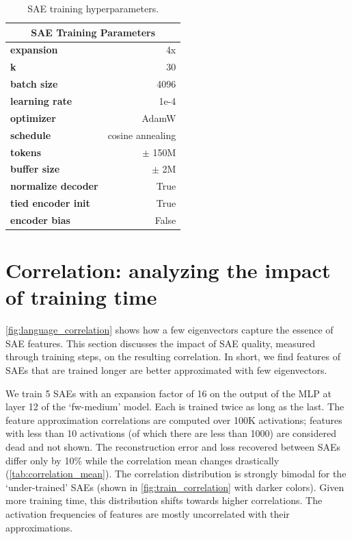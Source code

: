 \documentclass{article} %
\begin{document}
\begin{table}[H]
    \centering
    \caption{SAE training hyperparameters.}
    \begin{tabular}{lr}
        \multicolumn{2}{c}{\textbf{SAE Training Parameters}} \\
        \midrule
        \textbf{expansion} & 4x \\
        \textbf{k} & 30 \\
        \textbf{batch size} & 4096 \\
        \textbf{learning rate} & 1e-4 \\
        \textbf{optimizer} & AdamW \\
        \textbf{schedule} & cosine annealing \\
        \textbf{tokens} & $\pm$ 150M \\
        \textbf{buffer size} & $\pm$ 2M \\
        \textbf{normalize decoder} & True \\
        \textbf{tied encoder init} & True \\
        \textbf{encoder bias} & False \\
    \end{tabular}

    \label{tab:sae_parameters}
\end{table}

\section{Correlation: analyzing the impact of training time} \label{app:train_correlation}
\autoref{fig:language_correlation} shows how a few eigenvectors capture the essence of SAE features. This section discusses the impact of SAE quality, measured through training steps, on the resulting correlation. In short, we find features of SAEs that are trained longer are better approximated with few eigenvectors.

We train 5 SAEs with an expansion factor of 16 on the output of the MLP at layer 12 of the `fw-medium' model. Each is trained twice as long as the last. The feature approximation correlations are computed over 100K activations; features with less than 10 activations (of which there are less than 1000) are considered dead and not shown. The reconstruction error and loss recovered between SAEs differ only by 10\% while the correlation mean changes drastically (\autoref{tab:correlation_mean}). The correlation distribution is strongly bimodal for the `under-trained' SAEs (shown in \autoref{fig:train_correlation} with darker colors). Given more training time, this distribution shifts towards higher correlations. The activation frequencies of features are mostly uncorrelated with their approximations.
\end{document}
